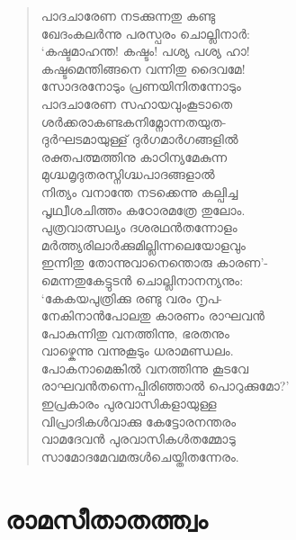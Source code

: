 \begin{verse}
പാദചാരേണ നടക്കുന്നതു കണ്ടു\\
ഖേദംകലര്‍ന്നു പരസ്പരം ചൊല്ലിനാര്‍:\\
‘കഷ്ടമാഹന്ത! കഷ്ടം! പശ്യ പശ്യ ഹാ!\\
കഷ്ടമെന്തിങ്ങനെ വന്നിതു ദൈവമേ!\\
സോദരനോടും പ്രണയിനിതന്നോടും\\
പാദചാരേണ സഹായവുംകൂടാതെ\\
ശര്‍ക്കരാകണ്ടകനിമ്നോന്നതയുത-\\
ദുര്‍ഘടമായുള്ള് ദുര്‍ഗമാര്‍ഗങ്ങളില്‍\\
രക്തപത്മത്തിനു കാഠിന്യമേകുന്ന\\
മുഗ്ദ്ധമൃദുതരസ്നിഗ്ദ്ധപാദങ്ങളാല്‍\\
നിത്യം വനാന്തേ നടക്കെന്നു കല്പിച്ച\\
പൃഥ്വീശചിത്തം കഠോരമത്രേ തുലോം.\\
പുത്രവാത്സല്യം ദശരഥന്‍തന്നോളം\\
മര്‍ത്ത്യരിലാര്‍ക്കുമില്ലിന്നലെയോളവും\\
ഇന്നിതു തോന്നുവാനെന്തൊരു കാരണ’-\\
മെന്നതുകേട്ടുടന്‍ ചൊല്ലിനാനന്യനും:\\
‘കേകയപുത്രിക്കു രണ്ടു വരം നൃപ-\\
നേകിനാന്‍പോലതു കാരണം രാഘവന്‍\\
പോകുന്നിതു വനത്തിന്നു, ഭരതനും\\
വാഴ്കെന്നു വന്നുകൂടും ധരാമണ്ഡലം.\\
പോകനാമെങ്കില്‍ വനത്തിന്നു കൂടവേ\\
രാഘവന്‍തന്നെപ്പിരിഞ്ഞാല്‍ പൊറുക്കുമോ?’\\
ഇപ്രകാരം പുരവാസികളായുള്ള\\
വിപ്രാദികള്‍വാക്കു കേട്ടോരനന്തരം\\
വാമദേവന്‍ പുരവാസികള്‍തമ്മോടു\\
സാമോദമേവമരുള്‍ചെയ്തിതന്നേരം.
\end{verse}


\section{രാമസീതാതത്ത്വം}


